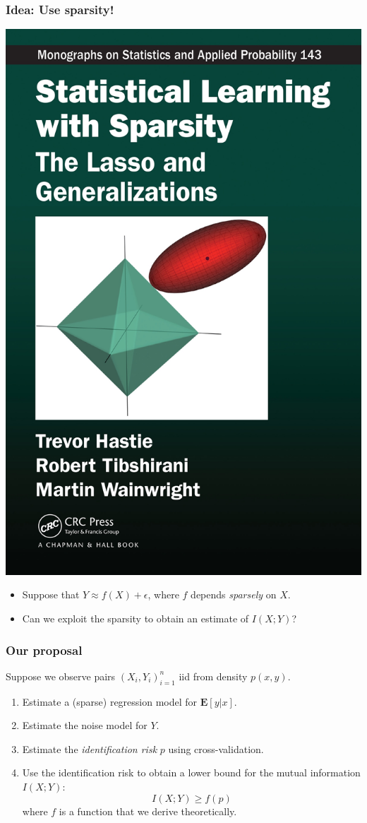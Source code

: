 \documentclass{beamer}
\newcommand{\E}{\textbf{E}}
\begin{document}
\begin{frame}
\frametitle{Idea: Use sparsity!}
\begin{center}
\includegraphics[scale = 0.05]{sls.jpg}
\end{center}
\begin{itemize}
\item Suppose that $Y \approx f(X) + \epsilon$, where $f$ depends \emph{sparsely} on $X$.
\item Can we exploit the sparsity to obtain an estimate of $I(X; Y)$?
\end{itemize}
\end{frame}


\begin{frame}
\frametitle{Our proposal}
Suppose we observe pairs $(X_i,Y_i)_{i=1}^n$ iid from density $p(x, y)$.
\begin{enumerate}
\item Estimate a (sparse) regression model for $\E[y|x]$.
\item Estimate the noise model for $Y$.
\item Estimate the \emph{identification risk} $p$ using cross-validation.
\item Use the identification risk to obtain a lower bound for the mutual information $I(X; Y)$:
\[
I(X; Y) \geq f(p)
\]
where $f$ is a function that we derive theoretically. 
\end{enumerate}
\end{frame}
\end{document}
